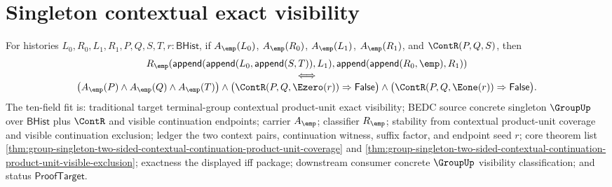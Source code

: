 \section{Singleton contextual exact visibility}
\label{sec:group-singleton-contextual-exact-visibility}

\begin{theorem}
\label{thm:group-singleton-two-sided-contextual-continuation-product-unit-exact-visibility}
For histories $L_0,R_0,L_1,R_1,P,Q,S,T,r:\mathsf{BHist}$, if
$A_{\emp}(L_0)$, $A_{\emp}(R_0)$, $A_{\emp}(L_1)$, $A_{\emp}(R_1)$, and
$\ContR(P,Q,S)$, then
$$
\begin{array}{c}
R_{\emp}(\mathsf{append}(\mathsf{append}(L_0,\mathsf{append}(S,T)),L_1),
\mathsf{append}(\mathsf{append}(R_0,\emp),R_1))\\
\Longleftrightarrow\\
\bigl(A_{\emp}(P)\land A_{\emp}(Q)\land A_{\emp}(T)\bigr)\land
\bigl(\ContR(P,Q,\Ezero(r))\Rightarrow\mathsf{False}\bigr)\land
\bigl(\ContR(P,Q,\Eone(r))\Rightarrow\mathsf{False}\bigr).
\end{array}
$$
The ten-field fit is: traditional target terminal-group contextual
product-unit exact visibility; BEDC source concrete singleton $\GroupUp$ over
$\mathsf{BHist}$ plus $\ContR$ and visible continuation endpoints; carrier
$A_{\emp}$; classifier $R_{\emp}$; stability from contextual product-unit
coverage and visible continuation exclusion; ledger the two context pairs,
continuation witness, suffix factor, and endpoint seed $r$; core theorem list
\autoref{thm:group-singleton-two-sided-contextual-continuation-product-unit-coverage}
and
\autoref{thm:group-singleton-two-sided-contextual-continuation-product-unit-visible-exclusion};
exactness the displayed iff package; downstream consumer concrete
$\GroupUp$ visibility classification; and status $\mathsf{ProofTarget}$.
\end{theorem}

